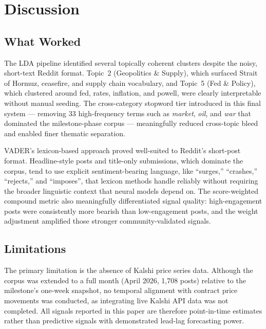 \documentclass[sigconf]{acmart}
\begin{document}
\section{Discussion}

\subsection{What Worked}

The LDA pipeline identified several topically coherent clusters despite the noisy, short-text Reddit format. Topic~2 (Geopolitics \& Supply), which surfaced Strait of Hormuz, ceasefire, and supply chain vocabulary, and Topic~5 (Fed \& Policy), which clustered around fed, rates, inflation, and powell, were clearly interpretable without manual seeding. The cross-category stopword tier introduced in this final system --- removing 33 high-frequency terms such as \textit{market}, \textit{oil}, and \textit{war} that dominated the milestone-phase corpus --- meaningfully reduced cross-topic bleed and enabled finer thematic separation.

VADER's lexicon-based approach proved well-suited to Reddit's short-post format. Headline-style posts and title-only submissions, which dominate the corpus, tend to use explicit sentiment-bearing language, like ``surges,'' ``crashes,'' ``rejects,'' and ``imposes'', that lexicon methods handle reliably without requiring the broader linguistic context that neural models depend on. The score-weighted compound metric also meaningfully differentiated signal quality: high-engagement posts were consistently more bearish than low-engagement posts, and the weight adjustment amplified those stronger community-validated signals.

\subsection{Limitations}

The primary limitation is the absence of Kalshi price series data. Although the corpus was extended to a full month (April 2026, 1,708 posts) relative to the milestone's one-week snapshot, no temporal alignment with contract price movements was conducted, as integrating live Kalshi API data was not completed. All signals reported in this paper are therefore point-in-time estimates rather than predictive signals with demonstrated lead-lag forecasting power.
\end{document}
